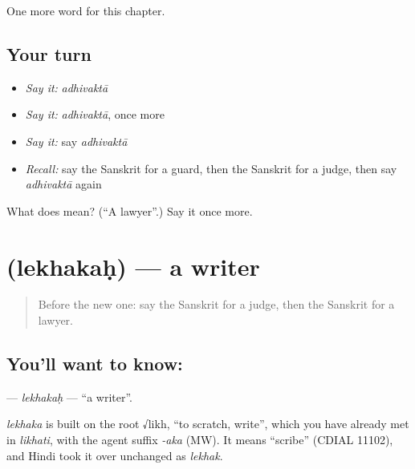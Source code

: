 \begin{grammarlens}[title={What you've built}]
One more word for this chapter.
\end{grammarlens}

\subsection*{Your turn}
\begin{itemize}
\raggedright
  \item \emph{Say it:} \emph{adhivaktā}
  \item \emph{Say it:} \emph{adhivaktā}, once more
  \item \emph{Say it:} say \emph{adhivaktā}
  \item \emph{Recall:} say the Sanskrit for a guard, then the Sanskrit for a judge, then say \emph{adhivaktā} again
\end{itemize}

\begin{tcolorbox}[breakable,colback=teal!4,colframe=teal!35!black,title={Before you move on}]
What does  mean? (\textquotedblleft{}A lawyer\textquotedblright{}.) Say it once more.
\end{tcolorbox}
\section[\texorpdfstring{\sk{लेखकः} (lekhakaḥ)}{लेखकः (lekhakaḥ)}]{ (lekhakaḥ) — a writer}

\label{lesson:SA-C179-lekhakah}



\begin{quote}
Before the new one: say the Sanskrit for a judge, then the Sanskrit for a lawyer.
\end{quote}

\subsection*{You'll want to know: }
\textbf{} — \emph{lekhakaḥ} — \textquotedblleft{}a writer\textquotedblright{}.

\begin{cousinweb}
\emph{lekhaka} is built on the root √likh, \textquotedblleft{}to scratch, write\textquotedblright{}, which you have already met in \emph{likhati}, with the agent suffix \emph{-aka} (MW). It means \textquotedblleft{}scribe\textquotedblright{} (CDIAL 11102), and Hindi took it over unchanged as \emph{lekhak}.
\end{cousinweb}

